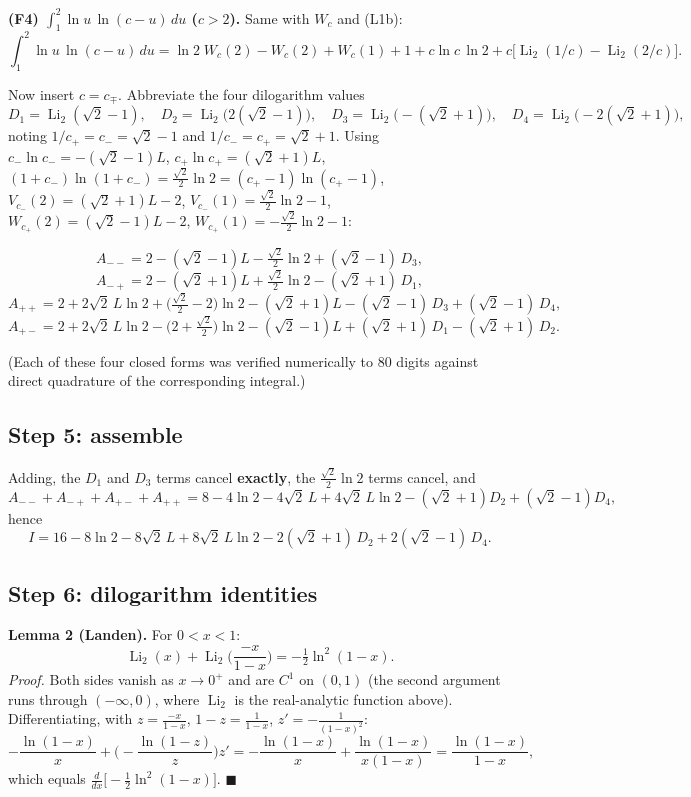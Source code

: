 \documentclass[11pt]{article}
\theoremstyle{remark}
\begin{document}
\textbf{(F4) $\int_1^2\ln u\,\ln(c-u)\,du$ ($c>2$).} Same with $W_c$ and (L1b):
$$\int_1^2\ln u\,\ln(c-u)\,du=\ln 2\;W_c(2)-W_c(2)+W_c(1)+1+c\ln c\,\ln2+c\big[\operatorname{Li}_2(1/c)-\operatorname{Li}_2(2/c)\big].$$

Now insert $c=c_\mp$. Abbreviate the four dilogarithm values
$$D_1=\operatorname{Li}_2(\sqrt2-1),\quad D_2=\operatorname{Li}_2\!\big(2(\sqrt2-1)\big),\quad D_3=\operatorname{Li}_2\!\big(-(\sqrt2+1)\big),\quad D_4=\operatorname{Li}_2\!\big(-2(\sqrt2+1)\big),$$
noting $1/c_+=c_-=\sqrt2-1$ and $1/c_-=c_+=\sqrt2+1$. Using $c_-\ln c_-=-(\sqrt2-1)L$, $c_+\ln c_+=(\sqrt2+1)L$, $(1+c_-)\ln(1+c_-)=\tfrac{\sqrt2}{2}\ln2=(c_+-1)\ln(c_+-1)$, $V_{c_-}(2)=(\sqrt2+1)L-2$, $V_{c_-}(1)=\tfrac{\sqrt2}{2}\ln2-1$, $W_{c_+}(2)=(\sqrt2-1)L-2$, $W_{c_+}(1)=-\tfrac{\sqrt2}{2}\ln2-1$:

$$A_{--}=2-(\sqrt2-1)L-\tfrac{\sqrt2}{2}\ln 2+(\sqrt2-1)\,D_3,$$
$$A_{-+}=2-(\sqrt2+1)L+\tfrac{\sqrt2}{2}\ln 2-(\sqrt2+1)\,D_1,$$
$$A_{++}=2+2\sqrt2\,L\ln 2+\Big(\tfrac{\sqrt2}{2}-2\Big)\ln 2-(\sqrt2+1)L-(\sqrt2-1)\,D_3+(\sqrt2-1)\,D_4,$$
$$A_{+-}=2+2\sqrt2\,L\ln 2-\Big(2+\tfrac{\sqrt2}{2}\Big)\ln 2-(\sqrt2-1)L+(\sqrt2+1)\,D_1-(\sqrt2+1)\,D_2.$$

(Each of these four closed forms was verified numerically to $80$ digits against direct quadrature of the corresponding integral.)

\subsection*{Step 5: assemble}

Adding, the $D_1$ and $D_3$ terms cancel \textbf{exactly}, the $\tfrac{\sqrt2}{2}\ln2$ terms cancel, and
$$A_{--}+A_{-+}+A_{+-}+A_{++}=8-4\ln 2-4\sqrt2\,L+4\sqrt2\,L\ln 2-(\sqrt2+1)D_2+(\sqrt2-1)D_4 ,$$
hence
\begin{equation*}I=16-8\ln2-8\sqrt2\,L+8\sqrt2\,L\ln2-2(\sqrt2+1)\,D_2+2(\sqrt2-1)\,D_4. \tag{5.1}\end{equation*}

\subsection*{Step 6: dilogarithm identities}

\textbf{Lemma 2 (Landen).} For $0<x<1$:
$$\operatorname{Li}_2(x)+\operatorname{Li}_2\!\Big(\frac{-x}{1-x}\Big)=-\tfrac12\ln^2(1-x).$$
\emph{Proof.} Both sides vanish as $x\to0^+$ and are $C^1$ on $(0,1)$ (the second argument runs through $(-\infty,0)$, where $\operatorname{Li}_2$ is the real-analytic function above). Differentiating, with $z=\tfrac{-x}{1-x}$, $1-z=\tfrac{1}{1-x}$, $z'=-\tfrac{1}{(1-x)^2}$:
$$-\frac{\ln(1-x)}{x}+\Big(-\frac{\ln(1-z)}{z}\Big)z'
=-\frac{\ln(1-x)}{x}+\frac{\ln(1-x)}{x(1-x)}=\frac{\ln(1-x)}{1-x},$$
which equals $\frac{d}{dx}\big[-\tfrac12\ln^2(1-x)\big]$. $\blacksquare$
\end{document}
